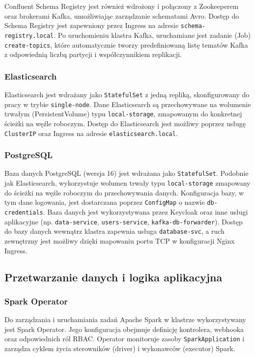Confluent Schema Registry jest również wdrożony i połączony z Zookeeperem oraz brokerami Kafka, umożliwiając zarządzanie schematami Avro. Dostęp do Schema Registry jest zapewniony przez Ingress na adresie \texttt{schema-registry.local}. Po uruchomieniu klastra Kafka, uruchamiane jest zadanie (Job) \texttt{create-topics}, które automatycznie tworzy predefiniowaną listę tematów Kafka z odpowiednią liczbą partycji i współczynnikiem replikacji.

\subsubsection{Elasticsearch}
Elasticsearch jest wdrażany jako \texttt{StatefulSet} z jedną repliką, skonfigurowany do pracy w trybie \texttt{single-node}. Dane Elasticsearch są przechowywane na wolumenie trwałym (PersistentVolume) typu \texttt{local-storage}, zmapowanym do konkretnej ścieżki na węźle roboczym. Dostęp do Elasticsearch jest możliwy poprzez usługę \texttt{ClusterIP} oraz Ingress na adresie \texttt{elasticsearch.local}.

\subsubsection{PostgreSQL}
Baza danych PostgreSQL (wersja 16) jest wdrażana jako \texttt{StatefulSet}. Podobnie jak Elasticsearch, wykorzystuje wolumen trwały typu \texttt{local-storage} zmapowany do ścieżki na węźle roboczym do przechowywania danych. Konfiguracja bazy, w tym dane logowania, jest dostarczana poprzez \texttt{ConfigMap} o nazwie \texttt{db-credentials}. Baza danych jest wykorzystywana przez Keycloak oraz inne usługi aplikacyjne (np. \texttt{data-service}, \texttt{users-service}, \texttt{kafka-db-forwarder}). Dostęp do bazy danych wewnątrz klastra zapewnia usługa \texttt{database-svc}, a ruch zewnętrzny jest możliwy dzięki mapowaniu portu TCP w konfiguracji Nginx Ingress.

\subsection{Przetwarzanie danych i logika aplikacyjna}

\subsubsection{Spark Operator}
Do zarządzania i uruchamiania zadań Apache Spark w klastrze wykorzystywany jest Spark Operator. Jego konfiguracja obejmuje definicję kontrolera, webhooka oraz odpowiednich ról RBAC. Operator monitoruje zasoby \texttt{SparkApplication} i zarządza cyklem życia sterowników (driver) i wykonawców (executor) Spark.

